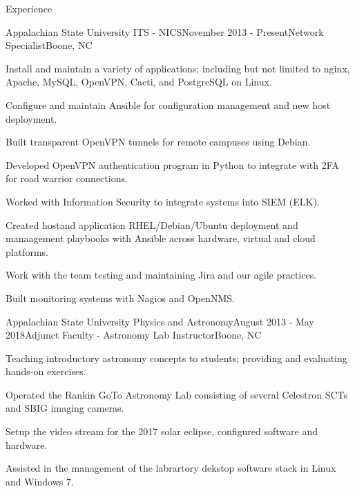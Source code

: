 \documentclass{cv} %
\begin{document}

\begin{rSection}{Experience}

\begin{rSubsection}{Appalachian State University ITS - NICS}{November 2013 - Present}{Network Specialist}{Boone, NC}
\item Install and maintain a variety of applications; including but not limited to nginx, Apache, MySQL, OpenVPN, Cacti, and PostgreSQL on Linux.
\item Configure and maintain Ansible for configuration management and new host deployment.
\item Built transparent OpenVPN tunnels for remote campuses using Debian.
\item Developed OpenVPN authentication program in Python to integrate with 2FA for road warrior connections.
\item Worked with Information Security to integrate systems into SIEM (ELK).
\item Created hostand application RHEL/Debian/Ubuntu deployment and manaagement playbooks with Ansible across hardware, virtual and cloud platforms. 
\item Work with the team testing and maintaining Jira and our agile practices.
\item Built monitoring systems with Nagios and OpenNMS.

\end{rSubsection}

\begin{rSubsection}{Appalachian State University Physics and Astronomy}{August 2013 - May 2018}{Adjunct Faculty - Astronomy Lab Instructor}{Boone, NC}
\item Teaching introductory astronomy concepts to students; providing and evaluating hands-on exercises.
\item Operated the Rankin GoTo Astronomy Lab consisting of several Celestron SCTs and SBIG imaging cameras.
\item Setup the video stream for the 2017 solar eclipse, configured software and hardware.
\item Assisted in the management of the labrartory dekstop software stack in Linux and Windows 7.
\end{rSubsection}


\end{rSection}
\end{document}
